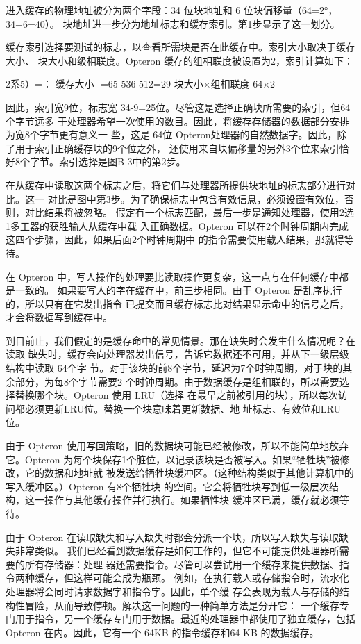 进入缓存的物理地址被分为两个字段：34 位块地址和 6 位块偏移量（64=2°，34+6=40）。
块地址进一步分为地址标志和缓存索引。第1步显示了这一划分。

缓存索引选择要测试的标志，以查看所需块是否在此缓存中。索引大小取决于缓存大小、
块大小和级相联度。Opteron 缓存的组相联度被设置为2，索引计算如下：

2系5）=：
缓存大小
-=65 536-512=29
块大小×组相联度
64×2

因此，索引宽9位，标志宽 34-9=25位。尽管这是选择正确块所需要的索引，但64个字节远多
于处理器希望一次使用的数目。因此，将缓存存储器的数据部分安排为宽8个字节更有意义一
些，这是 64位 Opteron处理器的自然数据字。因此，除了用于索引正确缓存块的9个位之外，
还使用来自块偏移量的另外3个位来索引恰好8个字节。索引选择是图B-3中的第2步。

在从缓存中读取这两个标志之后，将它们与处理器所提供块地址的标志部分进行对比。这一
对比是图中第3步。为了确保标志中包含有效信息，必须设置有效位，否则，对比结果将被忽略。
假定有一个标志匹配，最后一步是通知处理器，使用2选1多工器的获胜输人从缓存中载
入正确数据。Opteron 可以在2个时钟周期内完成这四个步骤，因此，如果后面2个时钟周期中
的指令需要使用载人结果，那就得等待。

在 Opteron 中，写人操作的处理要比读取操作更复杂，这一点与在任何缓存中都是一致的。
如果要写人的字在缓存中，前三步相同。由于 Opteron 是乱序执行的，所以只有在它发出指令
已提交而且缓存标志比对结果显示命中的信号之后，才会将数据写到缓存中。

到目前止，我们假定的是缓存命中的常见情景。那在缺失时会发生什么情况呢？在读取
缺失时，缓存会向处理器发出信号，告诉它数据还不可用，并从下一级层级结构中读取 64个字
节。对于该块的前8个字节，延迟为7个时钟周期，对于块的其余部分，为每8个字节需要2
个时钟周期。由于数据缓存是组相联的，所以需要选择替换哪个块。Opteron 使用 LRU（选择
在最早之前被引用的块），所以每次访问都必须更新LRU位。替换一个块意味着更新数据、地
址标志、有效位和LRU位。

由于 Opteron 使用写回策略，旧的数据块可能已经被修改，所以不能简单地放弃它。Opteron
为每个块保存1个脏位，以记录该块是否被写入。如果“牺牲块”被修改，它的数据和地址就
被发送给牺牲块缓冲区。（这种结构类似于其他计算机中的写入缓冲区。）Opteron 有8个牺牲块
的空间。它会将牺牲块写到低一级层次结构，这一操作与其他缓存操作并行执行。如果牺性块
缓冲区已满，缓存就必须等待。

由于 Opteron 在读取缺失和写入缺失时都会分派一个块，所以写人缺失与读取缺失非常类似。
我们已经看到数据缓存是如何工作的，但它不可能提供处理器所需要的所有存储器：处理
器还需要指令。尽管可以尝试用一个缓存来提供数据、指令两种缓存，但这样可能会成为瓶颈。
例如，在执行载人或存储指令时，流水化处理器将会同时请求数据字和指令字。因此，单个缓
存会表现为载人与存储的结构性冒险，从而导致停顿。解决这一问题的一种简单方法是分开它：
一个缓存专门用于指令，另一个缓存专门用于数据。最近的处理器中都使用了独立缓存，包括
Opteron 在内。因此，它有一个 64KB 的指令缓存和64 KB 的数据缓存。

